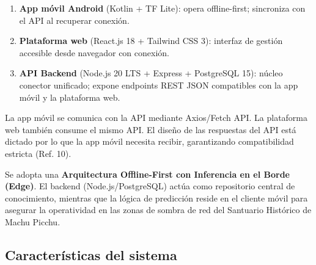 \documentclass[12pt, a4paper]{article}
\begin{document}
\begin{enumerate}
  \item \textbf{App m\'ovil Android} (Kotlin + TF Lite): opera offline-first; sincroniza con el API al recuperar conexi\'on.
  \item \textbf{Plataforma web} (React.js 18 + Tailwind CSS 3): interfaz de gesti\'on accesible desde navegador con conexi\'on.
  \item \textbf{API Backend} (Node.js 20 LTS + Express + PostgreSQL 15): n\'ucleo conector unificado; expone endpoints REST JSON compatibles con la app m\'ovil y la plataforma web.
\end{enumerate}

La app m\'ovil se comunica con la API mediante Axios/Fetch API. La plataforma web tambi\'en consume el mismo API. El dise\~no de las respuestas del API est\'a dictado por lo que la app m\'ovil necesita recibir, garantizando compatibilidad estricta (Ref. 10).

Se adopta una \textbf{Arquitectura Offline-First con Inferencia en el Borde (Edge)}. El backend (Node.js/PostgreSQL) act\'ua como repositorio central de conocimiento, mientras que la l\'ogica de predicci\'on reside en el cliente m\'ovil para asegurar la operatividad en las zonas de sombra de red del Santuario Hist\'orico de Machu Picchu.

\subsection{Caracter\'isticas del sistema}
\end{document}
